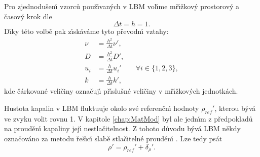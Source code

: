         Pro zjednodu\v{s}en\'{\i} vzorc\r{u} pou\v{z}\'{\i}van\'{y}ch v LBM vol\'{\i}me m\v{r}\'{\i}\v{z}kov\'{y} prostorov\'{y} a \v{c}asov\'{y} krok dle \cite{kruger2017lattice} 
        \begin{equation}
            \Delta t = h = 1.
        \end{equation}    
        D\'{\i}ky t\'{e}to volb\v{e} pak z\'{\i}sk\'{a}v\'{a}me tyto p\v{r}evodn\'{\i} vztahy:
        \begin{subequations}
        \begin{align}
            \nu &= \frac{h^2}{\Delta t} \nu', \\
            D &= \frac{h^2}{\Delta t} D', \\
            u_i &= \frac{h}{\Delta t}u_i' \qquad \forall i \in \{1,2,3 \}, \\
            k &= \frac{h}{\Delta t}k',
        \end{align}
        \end{subequations}
        kde \v{c}\'{a}rkovan\'{e} veli\v{c}iny ozna\v{c}uj\'{\i} p\v{r}\'{\i}slu\v{s}n\'{e} veli\v{c}iny v m\v{r}\'{\i}\v{z}kov\'{y}ch jednotk\'{a}ch.  

        Hustota kapalin v LBM fluktuuje okolo sv\'{e} referen\v{c}n\'{\i} hodnoty $\rho_{ref}'$, kterou b\'{y}v\'{a} ve zvyku volit rovnu 1. V kapitole \ref{chap:MatMod} byl ale jedn\'{\i}m z p\v{r}edpoklad\r{u} na proud\v{e}n\'{\i} kapaliny jej\'{\i} nestla\v{c}itelnost. Z tohoto d\r{u}vodu b\'{y}v\'{a} LBM n\v{e}kdy ozna\v{c}ov\'{a}no za metodu \v{r}e\v{s}\'{\i}c\'{\i} slab\v{e} stla\v{c}iteln\'{e} proud\v{e}n\'{\i} \cite{kruger2017lattice}. Lze tedy ps\'{a}t 
        \begin{equation}
            \rho' = \rho_{ref}' + \delta_\rho'.
        \end{equation}




        


        
